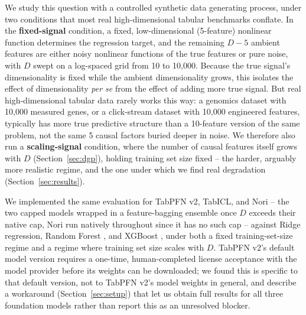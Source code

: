 \documentclass{article}
\begin{document}
We study this question with a controlled synthetic data generating process, under two
conditions that most real high-dimensional tabular benchmarks conflate. In the
\textbf{fixed-signal} condition, a fixed, low-dimensional (5-feature) nonlinear
function determines the regression target, and the remaining $D-5$ ambient features
are either noisy nonlinear functions of the true features or pure noise, with $D$
swept on a log-spaced grid from 10 to 10,000. Because the true signal's dimensionality
is fixed while the ambient dimensionality grows, this isolates the effect of
dimensionality \emph{per se} from the effect of adding more true signal. But real
high-dimensional tabular data rarely works this way: a genomics dataset with 10,000
measured genes, or a click-stream dataset with 10,000 engineered features, typically
has more true predictive structure than a 10-feature version of the same problem, not
the same 5 causal factors buried deeper in noise. We therefore also run a
\textbf{scaling-signal} condition, where the number of causal features itself grows
with $D$ (Section~\ref{sec:dgp}), holding training set size fixed -- the harder,
arguably more realistic regime, and the one under which we find real degradation
(Section~\ref{sec:results}).

We implemented the same evaluation for TabPFN v2, TabICL, and Nori -- the two
capped models wrapped in a feature-bagging ensemble \citep{feuer2023scaling} once $D$
exceeds their native cap, Nori run natively throughout since it has no such cap --
against Ridge regression, Random Forest \citep{breiman2001random}, and XGBoost
\citep{chen2016xgboost}, under both a fixed training-set-size regime and a regime
where training set size scales with $D$. TabPFN v2's default model version requires a
one-time, human-completed license acceptance with the model provider before its
weights can be downloaded; we found this is specific to that default version, not to
TabPFN v2's model weights in general, and describe a workaround
(Section~\ref{sec:setup}) that let us obtain full results for all three foundation
models rather than report this as an unresolved blocker.
\end{document}

